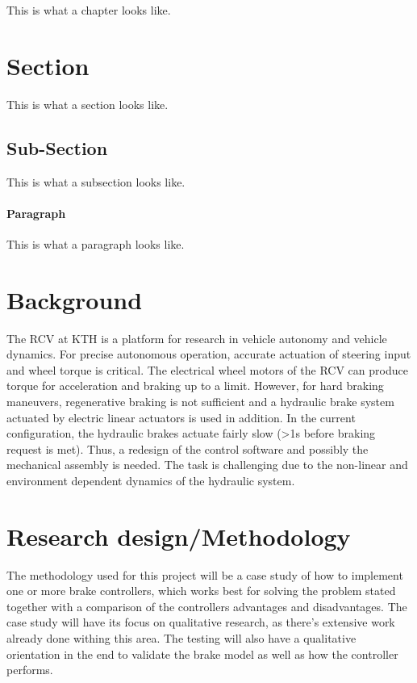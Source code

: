 \documentclass[a4paper,11pt]{kth-mag}
\begin{document}
This is what a chapter looks like.

\section{Section}

This is what a section looks like.

\subsection{Sub-Section}
This is what a subsection looks like.

\paragraph{Paragraph} This is what a paragraph looks like.

\section{Background}

 
The \gls{RCV} at KTH is a platform for research in vehicle autonomy and vehicle dynamics. For precise autonomous operation, accurate actuation of steering input and wheel torque is critical. The electrical wheel motors of the \gls{RCV} can produce torque for acceleration and braking up to a limit. However, for hard braking maneuvers, regenerative braking is not sufficient and a hydraulic brake system actuated by electric linear actuators is used in addition. In the current configuration, the hydraulic brakes actuate fairly slow (>1s before braking request is met). Thus, a redesign of the control software and possibly the mechanical assembly is needed. The task is challenging due to the non-linear and environment dependent dynamics of the hydraulic system.


\section{Research design/Methodology}
The methodology used for this project will be a case study of how to implement one or more brake controllers, which works best for solving the problem stated together with a comparison of the controllers advantages and disadvantages. The case study will have its focus on qualitative research, as there's extensive work already done withing this area. The testing will also have a qualitative orientation in the end to validate the brake model as well as how the controller performs. 
\end{document}
